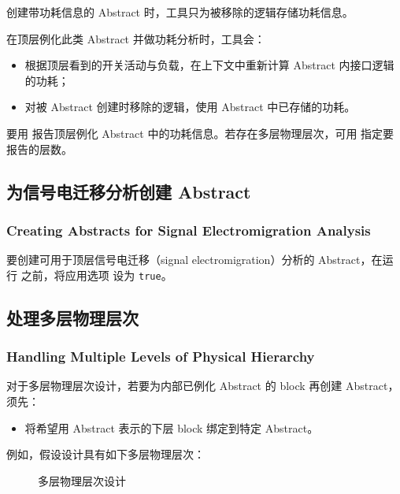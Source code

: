 创建带功耗信息的 Abstract 时，工具只为被移除的逻辑存储功耗信息。

在顶层例化此类 Abstract 并做功耗分析时，工具会：
\begin{itemize}
  \item 根据顶层看到的开关活动与负载，在上下文中重新计算 Abstract 内接口逻辑的功耗；
  \item 对被 Abstract 创建时移除的逻辑，使用 Abstract 中已存储的功耗。
\end{itemize}

要用  报告顶层例化 Abstract 中的功耗信息。若存在多层物理层次，可用  指定要报告的层数。

\subsection{为信号电迁移分析创建 Abstract}
\subsubsection*{Creating Abstracts for Signal Electromigration Analysis}

要创建可用于顶层信号电迁移（signal electromigration）分析的 Abstract，在运行  之前，将应用选项  设为 \texttt{true}。

\subsection{处理多层物理层次}
\subsubsection*{Handling Multiple Levels of Physical Hierarchy}

对于多层物理层次设计，若要为内部已例化 Abstract 的 block 再创建 Abstract，须先：
\begin{itemize}
  \item 将希望用 Abstract 表示的下层 block 绑定到特定 Abstract。
\end{itemize}

例如，假设设计具有如下多层物理层次：

\begin{figure}[htbp]
\centering
{}
\caption{多层物理层次设计}
\label{fig:hier-multi-level}
\end{figure}

